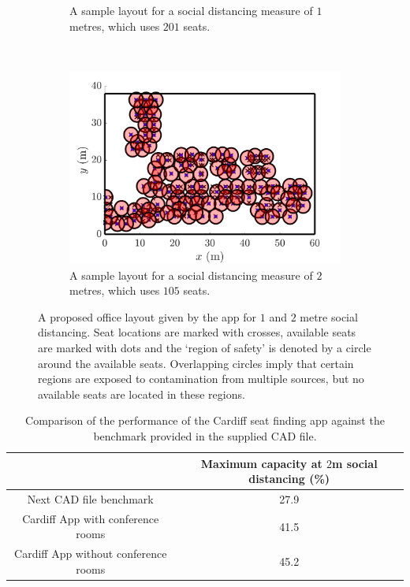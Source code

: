\documentclass[11pt,a4paper]{article}
\begin{document}
\begin{figure}[ht!]
\begin{subfigure}[h]{0.49\linewidth}
\caption{A sample layout for a social distancing measure of $1$ metres, which uses $201$ seats.}
\label{OneMetre}
\end{subfigure}
~
\begin{subfigure}[h]{0.490\linewidth}
\centering
\includegraphics[width = \linewidth]{two_metre.png}
\caption{A sample layout for a social distancing measure of $2$ metres, which uses $105$ seats.}
\label{TwoMetre}
\end{subfigure}
\caption{A proposed office layout given by the app for $1$ and $2$ metre social distancing. Seat locations are marked with crosses, available seats are marked with dots and the `region of safety' is denoted by a circle around the available seats. Overlapping circles imply that certain regions are exposed to contamination from multiple sources, but no available seats are located in these regions. }
\label{Demonstration_pics}
\end{figure}


\begin{table}[ht!]
\begin{center}
 \begin{tabular}{|c |c|} 
 \hline
& \textbf{Maximum capacity at $2$m social distancing (\%)}\\ 
 \hline
 Next CAD file benchmark &   27.9\\ 
 \hline
 Cardiff App  with conference rooms& 41.5\\
\hline
Cardiff App without conference rooms & 45.2\\
 \hline
\end{tabular}
\end{center}
\caption{Comparison of the performance of the Cardiff seat finding app against the benchmark provided in the supplied CAD file.}
\label{tab:performance}
\end{table}
\end{document}
